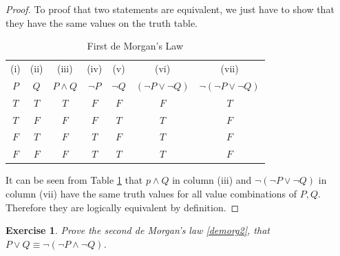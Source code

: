 \documentclass{article}[12pt]
\newtheorem{exercise}{Exercise}[section]
\begin{document}
            \begin{proof}
                To proof that two statements are equivalent, we just have to show that they have the same values on the truth table.
                
                \begin{table}[!ht]
                    \centering
                    \begin{tabular}{|c|c||c||c|c||c||c|}
                        \hline
                        (i) & (ii) & (iii) & (iv) &
                        (v) & (vi) & (vii)
                        \\
                             $P$ & $Q$ &
                             $P \land Q$ &
                             $\neg P$ & $\neg Q$ &
                             $(\neg P \lor \neg Q)$ &
                             $\neg(\neg P \lor \neg Q)$
                        \\ \hline\hline
                             $T$ & $T$ & $T$ &
                             $F$ & $F$ & $F$ & $T$
                        \\ \hline
                             $T$ & $F$ & $F$ &
                             $F$ & $T$ & $T$ & $F$
                        \\ \hline
                             $F$ & $T$ & $F$ &
                             $T$ & $F$ & $T$ & $F$
                        \\ \hline
                             $F$ & $F$ & $F$ &
                             $T$ & $T$ & $T$ & $F$
                        \\ \hline
                    \end{tabular}
                    \caption{First de Morgan's Law}
                    \label{tab:de-morgans-law-1}
                \end{table}
                
                It can be seen from Table \ref{tab:de-morgans-law-1} that $p \land Q$ in column (iii) and $\neg(\neg P \lor \neg Q)$ in column (vii) have the same truth values for all value combinations of $P, Q$. Therefore they are logically equivalent by definition.
            \end{proof}
            
            \begin{exercise}
                Prove the second de Morgan's law \eqref{demorg2}, that $P \lor Q  \equiv \neg (\neg P \land \neg Q)$.
            \end{exercise}
        
\end{document}
